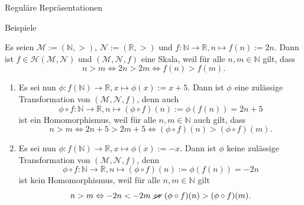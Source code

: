 \documentclass[
  8pt,
  ignorenonframetext,
]{beamer}
\begin{document}
\begin{frame}{Reguläre Repräsentationen}
\protect\hypertarget{reguluxe4re-repruxe4sentationen-1}{}
\small

Beispiele

\footnotesize

Es seien \(\mathcal{M} := (\mathbb{N},>)\),
\(\mathcal{N} := (\mathbb{R},>)\) und
\(f : \mathbb{N} \to \mathbb{R}, n \mapsto f(n) := 2n\). Dann ist
\(f \in \mathcal{H}(\mathcal{M},\mathcal{N})\) und
\((\mathcal{M},\mathcal{N},f)\) eine Skala, weil für alle
\(n,m\in \mathbb{N}\) gilt, dass \begin{equation}
n > m \Leftrightarrow 2n > 2m \Leftrightarrow f(n) > f(m).
\end{equation}

\begin{enumerate}
[(1)]
\item
  Es sei nun
  \(\phi : f(\mathbb{N}) \to \mathbb{R}, x \mapsto \phi(x) := x + 5\).
  Dann ist \(\phi\) eine zulässige Transformation von
  \((\mathcal{M},\mathcal{N},f)\), denn auch \begin{equation}
  \phi \circ f : \mathbb{N} \to \mathbb{R}, n \mapsto (\phi \circ f)(n) := \phi(f(n)) = 2n + 5
  \end{equation} ist ein Homomorphismus, weil für alle
  \(n,m\in \mathbb{N}\) auch gilt, dass \begin{equation}
  n > m \Leftrightarrow 2n + 5 > 2m + 5 \Leftrightarrow (\phi \circ f)(n) > (\phi \circ f)(m).
  \end{equation}
\item
  Es sei nun
  \(\phi : f(\mathbb{N}) \to \mathbb{R}, x \mapsto \phi(x) := -x\). Dann
  ist \(\phi\) keine zulässige Transformation von
  \((\mathcal{M},\mathcal{N},f)\), denn \begin{equation}
  \phi \circ f : \mathbb{N} \to \mathbb{R}, n \mapsto (\phi \circ f)(n) := \phi(f(n)) = -2n
  \end{equation} ist kein Homomorphismus, weil für alle
  \(n,m\in \mathbb{N}\) gilt \begin{equation}
  n > m \Leftrightarrow -2n < -2m \,\,\cancel{\Leftrightarrow}\,\, (\phi \circ f)(n) > (\phi \circ f)(m).
  \end{equation}
\end{enumerate}
\end{frame}
\end{document}
